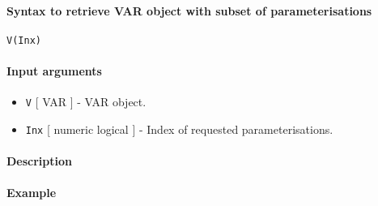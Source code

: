 


	\paragraph{Syntax to retrieve VAR object with subset of
parameterisations}

\begin{verbatim}
V(Inx)
\end{verbatim}

\paragraph{Input arguments}

\begin{itemize}
\item
  \texttt{V} {[} VAR {]} - VAR object.
\item
  \texttt{Inx} {[} numeric \textbar{} logical {]} - Index of requested
  parameterisations.
\end{itemize}

\paragraph{Description}

\paragraph{Example}


